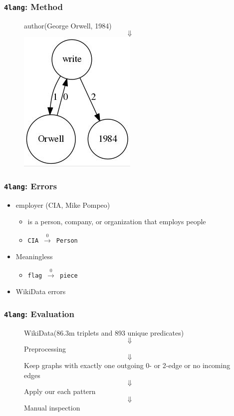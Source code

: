 \documentclass[bigger]{beamer}
\newcommand{\fl}{\texttt{4lang}\xspace}
\begin{document}
\begin{frame}
    \frametitle{\fl: Method}
    \begin{figure}
        \centering
        \small
            author(George Orwell, 1984)
            \[\Downarrow\]
            \includegraphics[scale=0.6]{pics/orwell_inf.jpg}
        \label{fig:method}
        \end{figure}
\end{frame}
\begin{frame}
    \frametitle{\fl: Errors}
    \begin{itemize}
        \pause \item employer (CIA, Mike Pompeo)
            \begin{itemize}
                \pause \item is a person, company, or organization that employs people
                \pause \item \texttt{CIA}~$\xrightarrow0$~\texttt{Person}
            \end{itemize}
        \pause \item Meaningless
            \begin{itemize}
                \pause \item \texttt{flag}~$\xrightarrow0$~\texttt{piece}
            \end{itemize}
        \pause \item WikiData errors
    \end{itemize}
\end{frame}

\begin{frame}
    \frametitle{\fl: Evaluation}
    \begin{figure}
        \centering
        \small
            WikiData(86.3m triplets and 893 unique predicates)
            \pause \[\Downarrow\]
            Preprocessing
            \pause \[\Downarrow\]
            Keep graphs with exactly one outgoing 0- or 2-edge or no incoming edges
            \pause \[\Downarrow\]
            Apply our each pattern
            \pause \[\Downarrow\]
            Manual inspection
         \label{fig:eval}
        \end{figure}

\end{frame}
\end{document}
